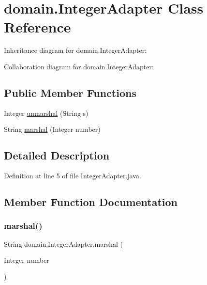 \hypertarget{classdomain_1_1IntegerAdapter}{}\section{domain.\+Integer\+Adapter Class Reference}
\label{classdomain_1_1IntegerAdapter}


Inheritance diagram for domain.\+Integer\+Adapter\+:


Collaboration diagram for domain.\+Integer\+Adapter\+:
\subsection*{Public Member Functions}
\begin{DoxyCompactItemize}
\item 
Integer \mbox{\hyperlink{classdomain_1_1IntegerAdapter_ad2bfc5af140573682dd03906b9264b51}{unmarshal}} (String s)
\item 
String \mbox{\hyperlink{classdomain_1_1IntegerAdapter_a407b4872b78e54ed80c9ae597cae2451}{marshal}} (Integer number)
\end{DoxyCompactItemize}


\subsection{Detailed Description}


Definition at line 5 of file Integer\+Adapter.\+java.



\subsection{Member Function Documentation}
\mbox{\label{classdomain_1_1IntegerAdapter_a407b4872b78e54ed80c9ae597cae2451}} 
\subsubsection{\texorpdfstring{marshal()}{marshal()}}
{\footnotesize\ttfamily String domain.\+Integer\+Adapter.\+marshal (\begin{DoxyParamCaption}\item[{Integer}]{number }\end{DoxyParamCaption})}



